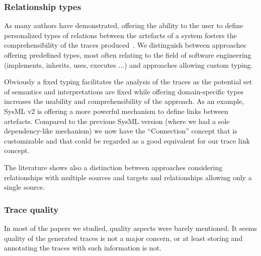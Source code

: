 \subsubsection{Relationship types} 
As many authors have demonstrated, offering the ability to the user to define personalized types of relations between the artefacts of a system fosters the comprehensibility of the traces produced~\cite{olive2002-representation-of-generic-relationship-types-in-modeling}. We distinguish between approaches offering predefined types, most often relating to the field of software engineering (implements, inherits, uses, executes ...) and approaches allowing custom typing. %

Obviously a fixed typing facilitates the analysis of the traces as the potential set of semantics and interpretations are fixed while offering domain-specific types increases the usability and comprehensibility of the approach. As an example, SysML v2 is offering a more powerful mechanism to define links between artefacts. Compared to the previous SysML version (where we had a sole dependency-like mechanism) we now have the ``Connection'' concept that is customizable and that could be regarded as a good equivalent for our trace link concept. 

The literature shows also a distinction between approaches considering relationships with multiple sources and targets and relationships allowing only a single source.  

\subsubsection{Trace quality} 
In most of the papers we studied, quality aspects were barely mentioned. It seems quality of the generated traces is not a major concern, or at least storing and annotating the traces with such information is not.

